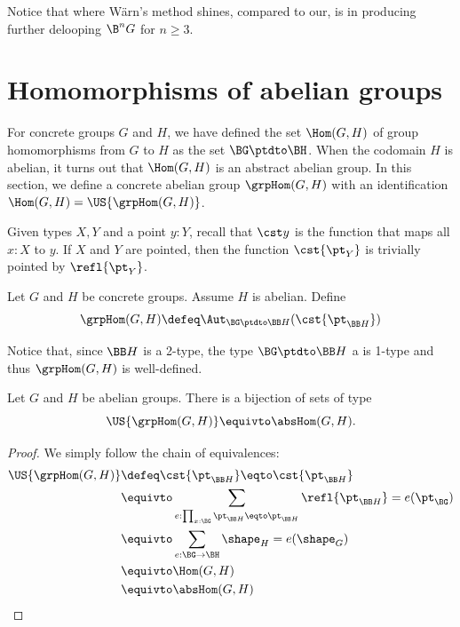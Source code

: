 Notice that where W\"arn's method shines, compared to our, is in
producing further delooping $\B^n G$ for $n\geq 3$.

\section{Homomorphisms of abelian groups}
\label{sec:ab-hom}

For concrete groups $G$ and $H$, we have defined the set $\Hom(G,H)$ of group
homomorphisms from $G$ to $H$ as the set $\BG \ptdto \BH$. When the codomain $H$
is abelian, it turns out that $\Hom(G,H)$ is an abstract abelian group. In this
section, we define a concrete abelian group $\grpHom(G,H)$ with an identification
$\Hom(G,H) = \US{\grpHom(G,H)}$.

Given types $X,Y$ and a point $y:Y$, recall that $\cst y$ is the function that
maps all $x:X$ to $y$. If $X$ and $Y$ are pointed, then the function $\cst
{\pt_Y}$ is trivially pointed by $\refl{\pt_Y}$.

\begin{definition}
  Let $G$ and $H$ be concrete groups. Assume $H$ is abelian. Define
  \begin{displaymath}
    \grpHom(G,H) \defeq \Aut_{\BG \ptdto \BB H} (\cst {\pt_{\BB H}})
  \end{displaymath}
\end{definition}

Notice that, since $\BB H$ is a 2-type, the type $\BG \ptdto \BB H$ a is 1-type
and thus $\grpHom(G,H)$ is well-defined.

\begin{construction}
  Let $G$ and $H$ be abelian groups. There is a bijection of sets of type
  \begin{displaymath}
    \US{\grpHom(G,H)} \equivto \absHom(G,H).
  \end{displaymath}
\end{construction} 
\begin{proof}
  We simply follow the chain of equivalences:
  \begin{align*}
    \US{\grpHom(G,H)}
    &\defeq \cst {\pt_{\BB H}} \eqto \cst {\pt_{\BB H}}
    \\
    &\equivto \sum_{e : \prod_{x:\BG} \pt_{\BB H} \eqto \pt_{\BB H}} \refl{\pt_{\BB H}} = e ({\pt_{\BG}})
    \\
    &\equivto \sum_{e : \BG \to \BH} \sh_H = e ({\sh_G}) 
    \\
    &\equivto \Hom(G,H)
    \\
    &\equivto \absHom(G,H)
  \end{align*}
\end{proof}

